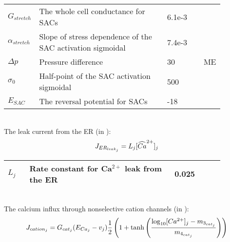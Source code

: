 %
\begin{table}[h!]
\centering
\begin{tabular}{| p{0.09\linewidth} | >{\footnotesize} p{0.6\linewidth} | >{\footnotesize} p{0.17\linewidth} | >{\footnotesize} p{0.02\linewidth} |}
\arrayrulecolor{lightgrey}\hline
$G_{stretch}$      		& The whole cell conductance for SACs						& 6.1e-3 \uMpmVs	&\cite{Koenigsberger2006} \\
$\alpha_{stretch}$      & Slope of stress dependence of the SAC activation sigmoidal	& 7.4e-3 \pmmHg	&\cite{Koenigsberger2006} \\
$ \Delta p $			& Pressure difference										& 30 \mmHg			& ME \\
$\sigma_{0}$      		& Half-point of the SAC activation sigmoidal				& 500 \mmHg			&\cite{Koenigsberger2006} \\
$E_{SAC}$      			& The reversal potential for SACs							& -18 \mV			&\cite{Koenigsberger2006} \\
\hline
\end{tabular}
\label{tab:Jstretchj}
\end{table}
\\
%
The leak current from the ER (in \uMs):
\begin{equation} \label{eq:JERleakj}
J_{ER_{leak_{j}}} = L_{j}[\widehat{Ca}^{2+}]_{j}
\end{equation}
%
\begin{table}[h!]
\centering
\begin{tabular}{| p{0.09\linewidth} | >{\footnotesize} p{0.6\linewidth} | >{\footnotesize} p{0.17\linewidth} | >{\footnotesize} p{0.02\linewidth} |}
\arrayrulecolor{lightgrey}\hline
$L_{j}$      			& Rate constant for Ca$^{2+}$ leak from the ER 		 & 0.025	\pers			& \cite{Koenigsberger2006} \\
\hline
\end{tabular}
\label{tab:JKj}
\end{table}
\\
%
The calcium influx through nonselective cation channels (in \uMs):
\begin{equation} \label{eq:Jcationj}
J_{cation_{j}} = G_{cat_{j}} (E_{Ca_{j}} - v_{j}) \frac{1}{2} \left(   1+ \mathrm{tanh}  \left(  \frac{\mathrm{log}_{10} [Ca^{2+}]_{j} - m_{3_{cat_{j}}} }    {m_{4_{cat_{j}}}}   \right)      \right) 
\end{equation}
%
%
